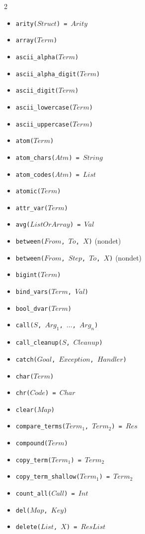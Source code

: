 \documentclass[10pt]{article}
\begin{document}
\begin{multicols}{2}
\begin{scriptsize}
\begin{itemize}
    \item \texttt{arity($Struct$) = $Arity$}
    \item \texttt{array($Term$)}
    \item \texttt{ascii\_alpha($Term$)}
    \item \texttt{ascii\_alpha\_digit($Term$)}
    \item \texttt{ascii\_digit($Term$)}
    \item \texttt{ascii\_lowercase($Term$)}
    \item \texttt{ascii\_uppercase($Term$)}
    \item \texttt{atom($Term$)} 
    \item \texttt{atom\_chars($Atm$) = $String$}
    \item \texttt{atom\_codes($Atm$) = $List$} 
    \item \texttt{atomic($Term$)} 
    \item \texttt{attr\_var($Term$)} 
    \item \texttt{avg($ListOrArray$) = $Val$}
    \item \texttt{between($From$, $To$, $X$)} (nondet)
    \item \texttt{between($From$, $Step$, $To$, $X$)} (nondet)    
    \item \texttt{bigint($Term$)}
    \item \texttt{bind\_vars($Term$, $Val$)}
    \item \texttt{bool\_dvar($Term$)}
    \item \texttt{call($S$, $Arg_1$, $\ldots$, $Arg_n$)} 
    \item \texttt{call\_cleanup($S$, $Cleanup$)} 
    \item \texttt{catch($Goal$, $Exception$, $Handler$)} 
    \item \texttt{char($Term$)} 
    \item \texttt{chr($Code$) = $Char$} 
    \item \texttt{clear($Map$)} 
    \item \texttt{compare\_terms($Term_1$, $Term_2$) = $Res$} 
    \item \texttt{compound($Term$)} 
    \item \texttt{copy\_term($Term_1$) = $Term_2$}
    \item \texttt{copy\_term\_shallow($Term_1$) = $Term_2$}
    \item \texttt{count\_all($Call$) = $Int$}
    \item \texttt{del($Map$, $Key$)}    
    \item \texttt{delete($List$, $X$) = $ResList$}

\end{itemize}
\end{scriptsize}
\end{multicols}
\end{document}
